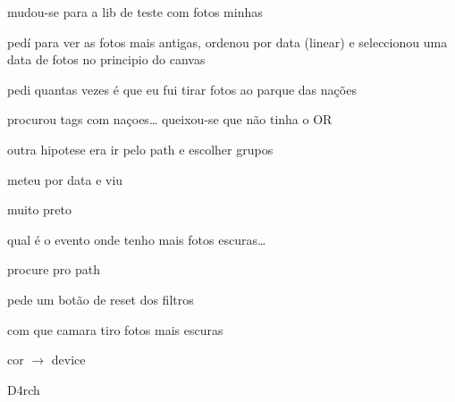 \begin{myitemize}
	\item mudou-se para a lib de teste com fotos minhas

	\item pedí para ver as fotos mais antigas, ordenou por data (linear) e seleccionou uma data de fotos no principio do canvas


	\item pedi quantas vezes é que eu fui tirar fotos ao parque das nações

	\item procurou tags com naçoes… queixou-se que não tinha o OR 

	\item outra hipotese era ir pelo path e escolher grupos

	\item meteu por data e viu


	\item muito preto


	\item qual é o evento onde tenho mais fotos escuras…

	\item procure pro path


	\item pede um botão de reset dos filtros


	\item com que camara tiro fotos mais escuras

	\item cor $\rightarrow$ device

\end{myitemize}



D4rch

